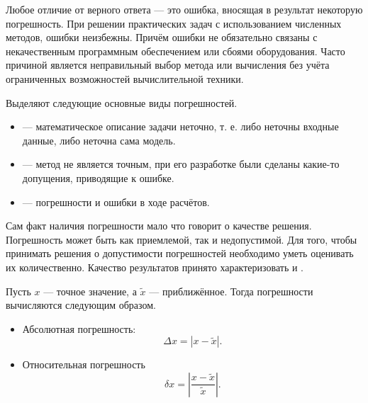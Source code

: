 

\Theory


Любое отличие от верного ответа — это ошибка, вносящая в результат
некоторую погрешность. При решении практических задач с использованием
численных методов, ошибки неизбежны. Причём ошибки не обязательно
связаны с некачественным программным обеспечением или сбоями
оборудования.  Часто причиной является неправильный выбор метода или
вычисления без учёта ограниченных возможностей вычислительной техники.

Выделяют следующие основные виды погрешностей.

\begin{itemize}
\item{} —
  математическое описание задачи неточно, т. е. либо неточны входные
  данные, либо неточна сама модель.
\item{} — метод не является
  точным, при его разработке были сделаны какие-то допущения,
  приводящие к ошибке.
\item{} —
  погрешности и ошибки в ходе расчётов.
\end{itemize}


Сам факт наличия погрешности мало что говорит о качестве решения.
Погрешность может быть как приемлемой, так и недопустимой. Для того,
чтобы принимать решения о допустимости погрешностей необходимо уметь
оценивать их количественно. Качество результатов принято
характеризовать  и
.

Пусть $x$ — точное значение, а $\tilde{x}$ — приближённое. Тогда
погрешности вычисляются следующим образом.
\begin{itemize}
\item Абсолютная погрешность:
  \[
  \boxed{
    \Delta x = \left|x-\tilde{x}\right|.
  }
  \]
\item Относительная погрешность
  \[
  \boxed{
  \delta x = \left|\frac{x-\tilde{x}}{\tilde{x}}\right|.
  }
  \]
\end{itemize}

